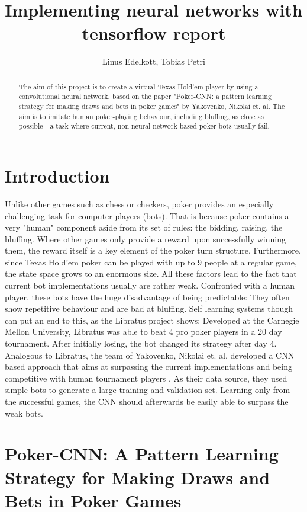 \documentclass[]{report}
\title{Implementing neural networks with tensorflow report}
\author{Linus Edelkott, Tobias Petri}
\begin{document}
\maketitle

\begin{abstract}
The aim of this project is to create a virtual Texas Hold'em player by using a convolutional neural network, based on the paper "Poker-CNN: a pattern learning strategy for making draws and bets in poker games" \cite{1} by Yakovenko, Nikolai et. al.
The aim is to imitate human poker-playing behaviour, including bluffing, as close as possible - a task where current, non neural network based poker bots usually fail.
\end{abstract}


\section{Introduction}
Unlike other games such as chess or checkers, poker provides an especially challenging task for computer players (bots). That is because poker contains a very "human" component aside from its set of rules: the bidding, raising, the bluffing. Where other games only provide a reward upon successfully winning them, the reward itself is a key element of the poker turn structure. Furthermore, since Texas Hold'em poker can be played with up to 9 people at a regular game, the state space grows to an enormous size. All these factors lead to the fact that current bot implementations usually are rather weak. Confronted with a human player, these bots have the huge disadvantage of being predictable: They often show repetitive behaviour and are bad at bluffing. Self learning systems though can put an end to this, as the Libratus project shows\cite{2}: Developed at the Carnegie Mellon University, Libratus was able to beat 4 pro poker players in a 20 day tournament. After initially losing, the bot changed its strategy after day 4. Analogous to Libratus, the team of Yakovenko, Nikolai et. al. developed a CNN based approach that aims at surpassing the current implementations and being competitive with human tournament players \cite{1}. As their data source, they used simple bots to generate a large training and validation set. Learning only from the successful games, the CNN should afterwards be easily able to surpass the weak bots.    

\section{Poker-CNN: A Pattern Learning Strategy for Making Draws and Bets in Poker Games}
\end{document}
